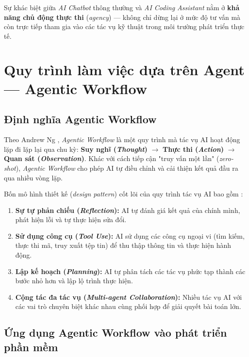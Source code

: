 \documentclass[13pt,a4paper,oneside]{extreport}
\numberwithin{equation}{chapter}
\numberwithin{figure}{chapter}
\numberwithin{table}{chapter}
\begin{document}
Sự khác biệt giữa \textit{AI Chatbot} thông thường và \textit{AI Coding Assistant} nằm ở \textbf{khả năng chủ động thực thi} (\textit{agency}) — không chỉ dừng lại ở mức độ tư vấn mà còn trực tiếp tham gia vào các tác vụ kỹ thuật trong môi trường phát triển thực tế.

\section{Quy trình làm việc dựa trên Agent — Agentic Workflow}

\subsection{Định nghĩa Agentic Workflow}

Theo Andrew Ng \cite{ref-agent}, \textit{Agentic Workflow} là một quy trình mà tác vụ AI hoạt động lặp đi lặp lại qua chu kỳ: \textbf{Suy nghĩ (\textit{Thought})} $\rightarrow$ \textbf{Thực thi (\textit{Action})} $\rightarrow$ \textbf{Quan sát (\textit{Observation})}. Khác với cách tiếp cận "truy vấn một lần" (\textit{zero-shot}), \textit{Agentic Workflow} cho phép AI tự điều chỉnh và cải thiện kết quả đầu ra qua nhiều vòng lặp.

Bốn mô hình thiết kế (\textit{design pattern}) cốt lõi của quy trình tác vụ AI bao gồm \cite{ref-agent}:

\begin{enumerate}
    \item \textbf{Sự tự phản chiếu (\textit{Reflection}):} AI tự đánh giá kết quả của chính mình, phát hiện lỗi và tự thực hiện sửa đổi.
    \item \textbf{Sử dụng công cụ (\textit{Tool Use}):} AI sử dụng các công cụ ngoại vi (tìm kiếm, thực thi mã, truy xuất tệp tin) để thu thập thông tin và thực hiện hành động.
    \item \textbf{Lập kế hoạch (\textit{Planning}):} AI tự phân tách các tác vụ phức tạp thành các bước nhỏ hơn và lập lộ trình thực hiện.
    \item \textbf{Cộng tác đa tác vụ (\textit{Multi-agent Collaboration}):} Nhiều tác vụ AI với các vai trò chuyên biệt khác nhau cùng phối hợp để giải quyết bài toán lớn.
\end{enumerate}

\subsection{Ứng dụng Agentic Workflow vào phát triển phần mềm}
\end{document}
